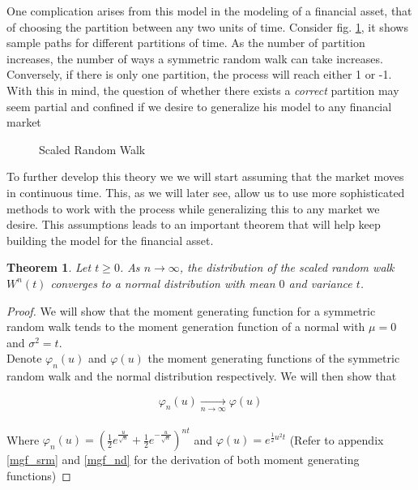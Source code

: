 \documentclass[11pt]{report}
\newtheorem{theorem}{Theorem}
\begin{document}
One complication arises from this model in the modeling of a financial asset, that of choosing the partition between any two units of time. Consider fig. \ref{scaled_random_walk}, it shows sample paths for different partitions of time. As the number of partition increases, the number of ways a symmetric random walk can take increases. Conversely, if there is only one partition, the process will reach either 1 or -1. With this in mind, the question of whether there exists a \textit{correct} partition may seem partial and confined if we desire to generalize his model to any financial market\\

\begin{figure}[h]
	\label{scaled_random_walk}
	\centering
	
	\caption{Scaled Random Walk}
\end{figure}


To further develop this theory we we will start assuming that the market moves in continuous time. This, as we will later see, allow us to use more sophisticated methods to work with the process while generalizing this to any market we desire. This assumptions leads to an important theorem that will help keep building the model for the financial asset.

\begin{theorem}
	Let $t \geq 0$. As $n \to \infty$, the distribution of the scaled random walk $W^n(t)$ converges to a normal distribution with mean $0$ and variance $t$.
\end{theorem}

\begin{proof}
	We will show that the moment generating function for a symmetric random walk tends to the moment generation function of a normal with $\mu = 0$ and $\sigma^2 = t$.\\
	
	Denote $\varphi_n(u)$ and $\varphi(u)$ the moment generating functions of the symmetric random walk and the normal distribution respectively. We will then show that
	
	\[\varphi_n(u) \xrightarrow[n \to \infty]{} \varphi(u)\] \\
	
	Where $\varphi_n(u) = \left(\frac{1}{2}e^{\frac{u}{\sqrt{n}}} + \frac{1}{2}e^{-\frac{u}{\sqrt{n}}}\right)^{nt}$ and $\varphi(u) = e^{\frac{1}{2}u^2t}$ (Refer to appendix \ref{mgf_srm} and \ref{mgf_nd} for the derivation of both moment generating functions)
	
\end{proof}
\end{document}
